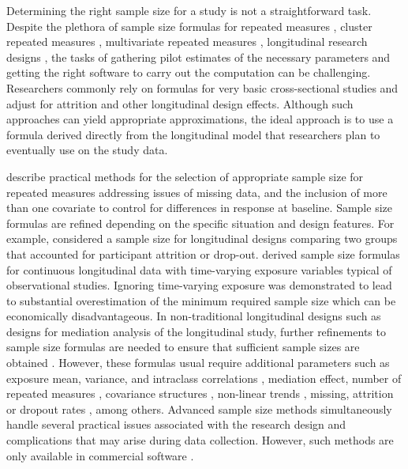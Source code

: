 Determining the right sample size for a study is not a straightforward task. Despite the plethora of sample size formulas for repeated measures \citep{Overall_Doyle(1994),Lui(1992),Rochon(1991), Guo_etal(2013)}, cluster repeated measures \citep{Liu_Shih_Gehan(2002)}, multivariate repeated measures \citep{Vonesh_Schork(1986),Guo_Johnson(1996)}, longitudinal research designs \citep{Lefante(1990)}, the tasks of gathering pilot estimates of the necessary parameters and getting the right software to carry out the computation can be challenging. Researchers commonly rely on formulas for very basic cross-sectional studies and adjust for attrition and other longitudinal design effects. Although such approaches can yield appropriate approximations, the ideal approach is to use a formula derived directly from the longitudinal model that researchers plan to eventually use on the study data.

\cite{Guo_etal(2013)} describe practical methods for the selection of appropriate sample size for repeated measures addressing issues of missing data, and the inclusion of more than one covariate to control for differences in response at baseline. Sample size formulas are refined depending on the specific situation and design features. For example, \cite{Hedeker_Gibbons_Waternaux(1999)} considered a sample size for longitudinal designs comparing two groups that accounted for participant attrition or drop-out. \cite{Basagana_Liao_Spiegelman(2011)} derived sample size formulas for continuous longitudinal data with time-varying exposure variables typical of observational studies. Ignoring time-varying exposure was demonstrated to lead to substantial overestimation of the minimum required sample size which can be economically disadvantageous. In non-traditional longitudinal designs such as designs for mediation analysis of the longitudinal study, further refinements to sample size formulas are needed to ensure that sufficient sample sizes are obtained \citep{Pan_etal(2018)}. However, these formulas usual require additional parameters such as exposure mean, variance, and intraclass correlations \citep{Basagana_Liao_Spiegelman(2011)}, mediation effect, number of repeated measures  \citep{Pan_etal(2018)}, covariance structures \citep{Rochon(1991)}, non-linear trends \citep{Yan_Su(2006)}, missing, attrition or dropout rates \citep{Roy_etal(2007), Lu_Luo_Chen(2008)}, among others.  Advanced sample size methods simultaneously handle several practical issues associated with the research design and complications that may arise during data collection. However, such methods are only available in commercial software \citep{NCSS(2021),nQuery(2021)}. 

